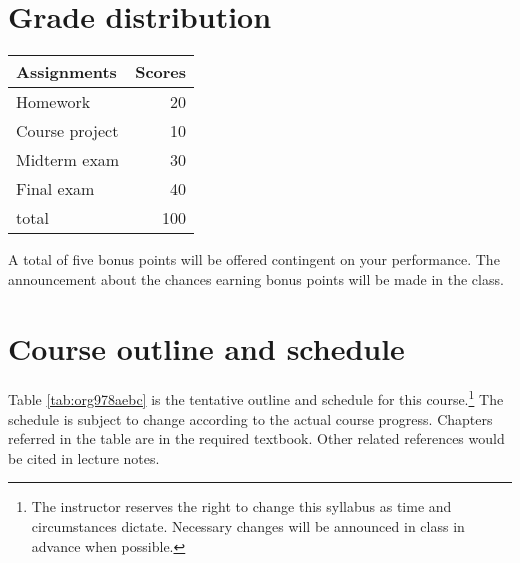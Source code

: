 \documentclass[a4paper,11pt]{article}
\begin{document}
\section{Grade distribution}
\label{sec:org7d450eb}

\begin{center}
\begin{tabular}{lr}
Assignments & Scores\\
\hline
Homework & 20\\
Course project & 10\\
Midterm exam & 30\\
Final exam & 40\\
\hline
total & 100\\
\end{tabular}
\end{center}

A total of five bonus points will be offered contingent on your
performance. The announcement about the chances earning bonus points
will be made in the class.


\section{Course outline and schedule}
\label{sec:orgd7b892e}

Table \ref{tab:org978aebc} is the tentative outline and schedule for this course.\footnote{The instructor reserves the right to change this syllabus as
time and circumstances dictate. Necessary changes will be announced in
class in advance when possible.} The
schedule is subject to change according to the actual course
progress. Chapters referred in the table are in the required
textbook. Other related references would be cited in lecture notes.
\end{document}
